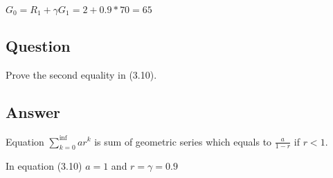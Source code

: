 \documentclass[11pt]{article}
\begin{document}
    $G_0 = R_{1} + \gamma G_{1} = 2 + 0.9 * 70 = 65 $

    \subsection{Question}

    Prove the second equality in (3.10).

    \subsection*{Answer}


    Equation $\sum_{k=0}^{\inf}ar^k$ is sum of geometric series which equals to $\frac{a}{1-r}$ if $r<1$.

    In equation (3.10) $a=1$ and $r = \gamma = 0.9$
\end{document}
